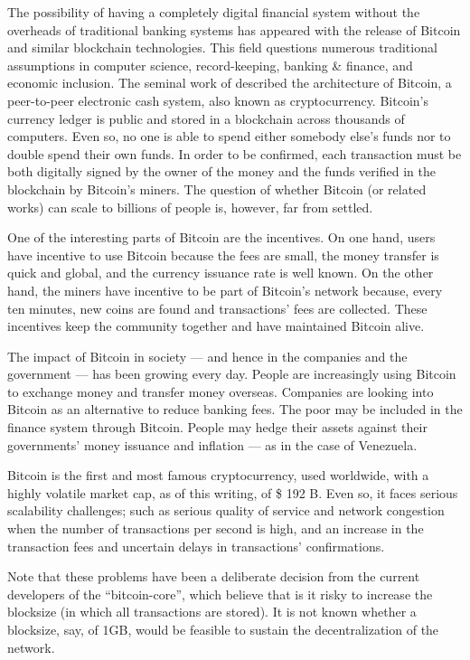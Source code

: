 The possibility of having a completely digital financial system without the overheads of traditional banking systems has appeared with the release of Bitcoin and similar blockchain technologies.  This field questions numerous traditional assumptions in computer science, record-keeping, banking \& finance, and economic inclusion. The seminal work of \citet{nakamoto2008bitcoin} described the architecture of Bitcoin, a peer-to-peer electronic cash system, also known as cryptocurrency. Bitcoin's currency ledger is public and stored in a blockchain across thousands of computers. Even so, no one is able to spend either somebody else's funds nor to double spend their own funds. In order to be confirmed, each transaction must be both digitally signed by the owner of the money and the funds verified in the blockchain by Bitcoin's miners. The question of whether Bitcoin (or related works) can scale to billions of people is, however, far from settled.

One of the interesting parts of Bitcoin are the incentives. On one hand, users have incentive to use Bitcoin because the fees are small, the money transfer is quick and global, and the currency issuance rate is well known. On the other hand, the miners have incentive to be part of Bitcoin's network because, every ten minutes, new coins are found and transactions' fees are collected. These incentives keep the community together and have maintained Bitcoin alive.

The impact of Bitcoin in society --- and hence in the companies and the government --- has been growing every day. People are increasingly using Bitcoin to exchange money and transfer money overseas. Companies are looking into Bitcoin as an alternative to reduce banking fees. The poor may be included in the finance system through Bitcoin. People may hedge their assets against their governments' money issuance and inflation --- as in the case of Venezuela.

Bitcoin is the first and most famous cryptocurrency, used worldwide, with a highly volatile market cap, as of this writing, of \$ 192 B. Even so, it faces serious scalability challenges; such as serious quality of service and network congestion when the number of transactions per second is high, and an increase in the transaction fees and uncertain delays in transactions' confirmations.

Note that these problems have been a deliberate decision from the current developers of the ``bitcoin-core'', which believe that is it risky to increase the blocksize (in which all transactions are stored).  It is not known whether a blocksize, say, of 1GB, would be feasible to sustain the decentralization of the network.


